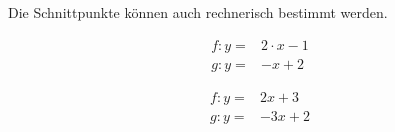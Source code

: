 \documentclass[a4paper, DIV=13]{scrartcl}
\begin{document}
\vskip 10pt

Die Schnittpunkte können auch rechnerisch bestimmt werden.


\begin{minipage}{0.5\linewidth}
\begin{align*}
f\colon y=& 2 \cdot x - 1\\
g\colon y=& -  x + 2
\end{align*}


\end{minipage}
\begin{minipage}{0.5\linewidth}
\begin{align*}
f\colon y=& 2x + 3\\
g\colon y=& -3x +2
\end{align*}

\end{minipage}

\begin{minipage}{0.5\linewidth}
\end{minipage}
\begin{minipage}{0.5\linewidth}
\end{minipage}
\end{document}
